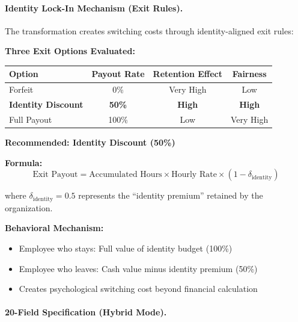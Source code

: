 \paragraph{Identity Lock-In Mechanism (Exit Rules).}

The transformation creates switching costs through identity-aligned exit rules:

\begin{tcolorbox}[colback=blue!5!white, colframe=blue!75!black,
    title=\textbf{Identity Lock-In: Exit Rule Design}]

\textbf{Three Exit Options Evaluated:}

\begin{center}
\renewcommand{\arraystretch}{1.2}
\begin{tabular}{@{}lccc@{}}
\toprule
\textbf{Option} & \textbf{Payout Rate} & \textbf{Retention Effect} & \textbf{Fairness} \\
\midrule
Forfeit & 0\% & Very High & Low \\
\textbf{Identity Discount} & \textbf{50\%} & \textbf{High} & \textbf{High} \\
Full Payout & 100\% & Low & Very High \\
\bottomrule
\end{tabular}
\end{center}

\textbf{Recommended: Identity Discount (50\%)}

\textbf{Formula:}
\begin{equation}
\text{Exit Payout} = \text{Accumulated Hours} \times \text{Hourly Rate} \times (1 - \delta_{\text{identity}})
\label{eq:hhh-identity-discount}
\end{equation}

where $\delta_{\text{identity}} = 0.5$ represents the ``identity premium'' retained by the organization.

\textbf{Behavioral Mechanism:}
\begin{itemize}[nosep]
    \item Employee who stays: Full value of identity budget (100\%)
    \item Employee who leaves: Cash value minus identity premium (50\%)
    \item Creates psychological switching cost beyond financial calculation
\end{itemize}

\end{tcolorbox}

\paragraph{20-Field Specification (Hybrid Mode).}

